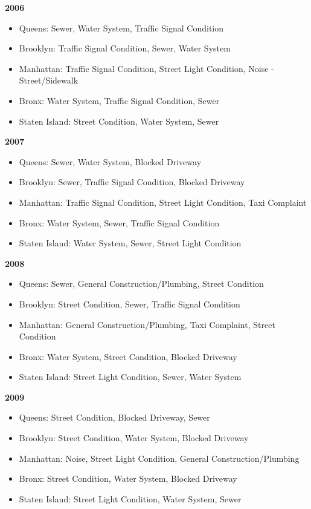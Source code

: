 \documentclass[sigconf]{acmart}
\begin{document}
\textbf{2006}
\begin{itemize}
    \item Queens: Sewer, Water System, Traffic Signal Condition
    \item Brooklyn: Traffic Signal Condition, Sewer, Water System
    \item Manhattan: Traffic Signal Condition, Street Light Condition, Noise - Street/Sidewalk
    \item Bronx: Water System, Traffic Signal Condition, Sewer
    \item Staten Island: Street Condition, Water System, Sewer
\end{itemize}


\textbf{2007}
\begin{itemize}
    \item Queens: Sewer, Water System, Blocked Driveway
    \item Brooklyn: Sewer, Traffic Signal Condition, Blocked Driveway
    \item Manhattan: Traffic Signal Condition, Street Light Condition, Taxi Complaint
    \item Bronx: Water System, Sewer, Traffic Signal Condition
    \item Staten Island: Water System, Sewer, Street Light Condition
\end{itemize}

\textbf{2008}
\begin{itemize}
    \item Queens: Sewer, General Construction/Plumbing, Street Condition
    \item Brooklyn: Street Condition, Sewer, Traffic Signal Condition
    \item Manhattan: General Construction/Plumbing, Taxi Complaint, Street Condition
    \item Bronx: Water System, Street Condition, Blocked Driveway
    \item Staten Island: Street Light Condition, Sewer, Water System
\end{itemize}

\textbf{2009}
\begin{itemize}
    \item Queens: Street Condition, Blocked Driveway, Sewer
    \item Brooklyn: Street Condition, Water System, Blocked Driveway
    \item Manhattan: Noise, Street Light Condition, General Construction/Plumbing
    \item Bronx: Street Condition, Water System, Blocked Driveway
    \item Staten Island: Street Light Condition, Water System, Sewer
\end{itemize}
\end{document}
